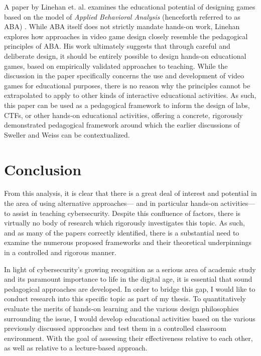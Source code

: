     A paper by Linehan et. al. examines the educational potential of designing games based on the model of \emph{Applied Behavioral Analysis} (henceforth referred to as ABA) \cite{C-Linehan}. %
While ABA itself does not strictly mandate hands-on work, Linehan explores how approaches in video game design closely resemble the pedagogical principles of ABA. His work ultimately suggests that through careful and deliberate design, it should be entirely possible to design hands-on educational games, based on empirically validated approaches to teaching. %
While the discussion in the paper specifically concerns the use and development of video games for educational purposes, there is no reason why the principles cannot be extrapolated to apply to other kinds of interactive educational activities. %
As such, this paper can be used as a pedagogical framework to inform the design of labs, CTFs, or other hands-on educational activities, offering a concrete, rigorously demonstrated pedagogical framework around which the earlier discussions of Sweller and Weiss can be contextualized. 

\section{Conclusion}

    From this analysis, it is clear that there is a great deal of interest and potential in the area of using alternative approaches---%
and in particular hands-on activities---%
to assist in teaching cybersecurity. %
Despite this confluence of factors, there is virtually no body of research which rigorously investigates this topic. %
As such, and as many of the papers correctly identified, there is a substantial need to examine the numerous proposed frameworks and their theoretical underpinnings in a controlled and rigorous manner. 

    In light of cybersecurity's growing recognition as a serious area of academic study and its paramount importance to life in the digital age, it is essential that sound pedagogical approaches are developed. %
In order to bridge this gap, I would like to conduct research into this specific topic as part of my thesis. %
To quantitatively evaluate the merits of hands-on learning and the various design philosophies surrounding the issue, I would develop educational activities based on the various previously discussed approaches and test them in a controlled classroom environment. %
With the goal of assessing their effectiveness relative to each other, as well as relative to a lecture-based approach. %
